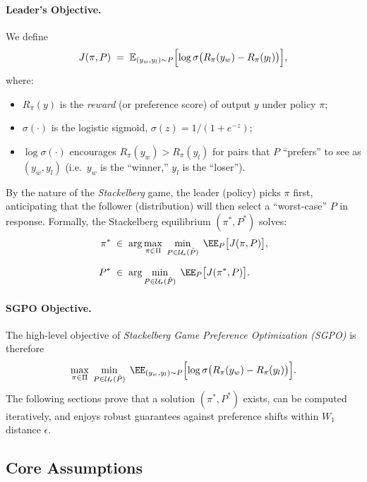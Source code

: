 \paragraph{Leader’s Objective.}
We define
\[
J(\pi,P)
\;=\;\mathbb{E}_{(y_w,y_l)\sim P}\Bigl[\log \sigma\bigl(R_{\pi}(y_w)- R_{\pi}(y_l)\bigr)\Bigr],
\]
where:
\begin{itemize}
\item $R_{\pi}(y)$ is the \emph{reward} (or preference score) of output $y$ under policy $\pi$;
\item $\sigma(\cdot)$ is the logistic sigmoid, $\sigma(z) = 1/(1+e^{-z})$;
\item $\log \sigma(\cdot)$ encourages $R_\pi(y_w)>R_\pi(y_l)$ for pairs that $P$ “prefers” to see as $(y_w,y_l)$ (i.e.\ $y_w$ is the “winner,” $y_l$ is the “loser”).
\end{itemize}

By the nature of the \emph{Stackelberg} game, the leader (policy) picks $\pi$ first, anticipating that the follower (distribution) will then select a “worst-case” $P$ in response.  Formally, the Stackelberg equilibrium $(\pi^*,P^*)$ solves:
\begin{align}
\pi^* 
&\;\in\;
\arg\max_{\pi\in \Pi} \;\min_{P\in \mathcal{U}_\epsilon(\hat{P})} 
\;\EE_{P}\bigl[J(\pi,P)\bigr], 
\label{eq:SGPO-leader} \\[6pt]
P^*
&\;\in\;
\arg\min_{P\in \mathcal{U}_\epsilon(\hat{P})}
\;\EE_{P}\bigl[J(\pi^*,P)\bigr].
\label{eq:SGPO-follower}
\end{align}

\paragraph{SGPO Objective.}
The high-level objective of \emph{Stackelberg Game Preference Optimization (SGPO)} is therefore
\begin{equation}
\label{eq:SGPO-obj}
\max_{\pi\in \Pi} \;
\min_{P\in \mathcal{U}_\epsilon(\hat{P})}
\; \EE_{(y_w,y_l)\sim P}\Bigl[\log \sigma\bigl(R_\pi(y_w) - R_\pi(y_l)\bigr)\Bigr].
\end{equation}
The following sections prove that a solution $(\pi^*,P^*)$ exists, can be computed iteratively, and enjoys robust guarantees against preference shifts within $W_1$ distance $\epsilon$.

\subsection{Core Assumptions}
\label{sec:assumptions}

